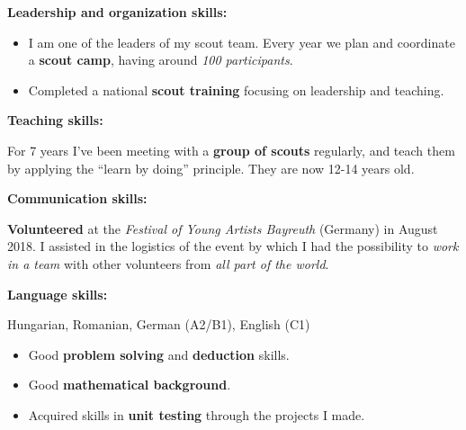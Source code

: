 
\textbf{Leadership and organization skills:} 

\begin{itemize}
\item I am one of the leaders of my scout team. Every year we plan and coordinate a \textbf{scout camp}, having around \textit{100 participants}.

\item Completed a national \textbf{scout training} focusing on leadership and teaching.
\end{itemize}

\divider

\textbf{Teaching skills:} 

For 7 years I've been meeting with a \textbf{group of scouts} regularly, and teach them by applying the ``learn by doing'' principle. They are now 12-14 years old.
 

\divider

\textbf{Communication skills:} 

\textbf{Volunteered} at the \textit{Festival of Young Artists Bayreuth} (Germany) in August 2018. I assisted in the logistics of the event by which I had the possibility to \textit{work in a team} with other volunteers from \textit{all part of the world}.

\divider

\textbf{Language skills:} 

Hungarian, Romanian, German (A2/B1), English (C1)



\smallskip


\begin{itemize}

\item Good \textbf{problem solving} and \textbf{deduction} skills.

\item Good \textbf{mathematical background}.

\item Acquired skills in \textbf{unit testing} through the projects I made.

\end{itemize}


